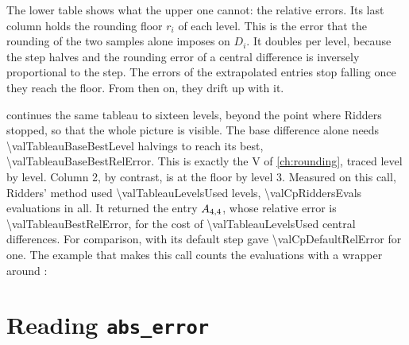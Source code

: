 The lower table shows what the upper one cannot: the relative errors. Its last column holds the rounding floor $r_i$
of each level. This is the error that the rounding of the two samples alone imposes on $D_i$. It doubles per level,
because the step halves and the rounding error of a central difference is inversely proportional to the step. The
errors of the extrapolated entries stop falling once they reach the floor. From then on, they drift up with it.

\begin{figure}
\centering

\end{figure}

 continues the same tableau to sixteen levels, beyond the point where Ridders stopped,
so that the whole picture is visible. The base difference alone needs \num{\valTableauBaseBestLevel} halvings to
reach its best, \num{\valTableauBaseBestRelError}. This is exactly the V of \cref{ch:rounding}, traced level by
level. Column 2, by contrast, is at the floor by level 3. Measured on this call, Ridders' method used
\num{\valTableauLevelsUsed} levels, \num{\valCpRiddersEvals} evaluations in all. It returned the entry
$A_{\num{4},\num{4}}$, whose relative error is \num{\valTableauBestRelError},
for the cost of \num{\valTableauLevelsUsed} central differences. For comparison,  with its default
step gave \num{\valCpDefaultRelError} for one. The example that makes this call counts the evaluations with a
wrapper around :

\section{Reading \texttt{abs\_error}}\label{sec:ridders-estimate}

